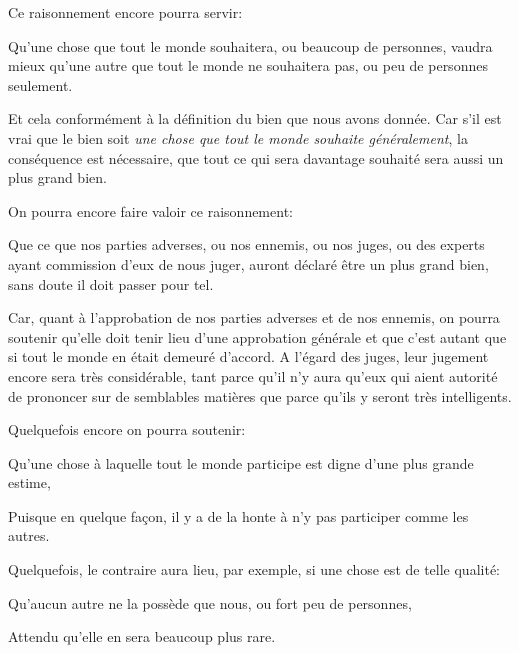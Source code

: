 Ce raisonnement encore pourra servir:

\begin{emphpar}
	Qu'une chose que tout le monde souhaitera, ou beaucoup de personnes, vaudra mieux qu'une autre que tout le monde ne
	souhaitera pas, ou peu de personnes seulement.
\end{emphpar}

Et cela conformément à la définition du bien que nous avons donnée. Car s'il est vrai que le bien soit \emph{une chose
que tout le monde souhaite généralement}, la conséquence est nécessaire, que tout ce qui sera davantage souhaité sera
aussi un plus grand bien.

\bigbreak

On pourra encore faire valoir ce raisonnement:

\begin{emphpar}
	Que ce que nos parties adverses, ou nos ennemis, ou nos juges, ou des experts ayant commission d'eux de nous juger,
	auront déclaré être un plus grand bien, sans doute il doit passer pour tel.
\end{emphpar}

Car, quant à l'approbation de nos parties adverses et de nos ennemis, on pourra soutenir qu'elle doit tenir lieu d'une
approbation générale et que c'est autant que si tout le monde en était demeuré d'accord. A l'égard des juges, leur jugement
encore sera très considérable, tant parce qu'il n'y aura qu'eux qui aient autorité de prononcer sur de semblables matières
que parce qu'ils y seront très intelligents.

\bigbreak

Quelquefois encore on pourra soutenir:

\begin{emphpar}
	Qu'une chose à laquelle tout le monde participe est digne d'une plus grande estime,
\end{emphpar}

Puisque en quelque façon, il y a de la honte à n'y pas participer comme les autres.

Quelquefois, le contraire aura lieu, par exemple, si une chose est de telle qualité:

\begin{emphpar}
	Qu'aucun autre ne la possède que nous, ou fort peu de personnes,
\end{emphpar}

Attendu qu'elle en sera beaucoup plus rare.

\bigbreak

